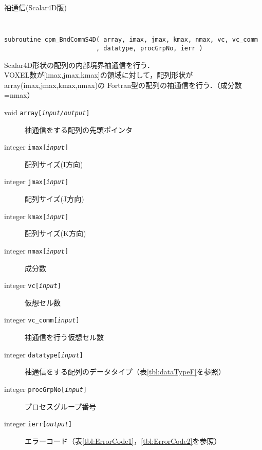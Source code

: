 \begin{spacing}{0.8}
\begin{itembox}[l]{袖通信(Scalar4D版)}
{\tt
\begin{verbatim}
subroutine cpm_BndCommS4D( array, imax, jmax, kmax, nmax, vc, vc_comm
                         , datatype, procGrpNo, ierr )
\end{verbatim}
}
Scalar4D形状の配列の内部境界袖通信を行う．\\
VOXEL数が[imax,jmax,kmax]の領域に対して，配列形状がarray(imax,jmax,kmax,nmax)の
Fortran型の配列の袖通信を行う．（成分数=nmax）
\begin{description}
\item[void    {\tt array[{\it input/output}]}] 袖通信をする配列の先頭ポインタ
\item[integer {\tt imax[{\it input}]}] 配列サイズ(I方向)
\item[integer {\tt jmax[{\it input}]}] 配列サイズ(J方向)
\item[integer {\tt kmax[{\it input}]}] 配列サイズ(K方向)
\item[integer {\tt nmax[{\it input}]}] 成分数
\item[integer {\tt vc[{\it input}]}] 仮想セル数
\item[integer {\tt vc\_comm[{\it input}]}] 袖通信を行う仮想セル数
\item[integer {\tt datatype[{\it input}]}] 袖通信をする配列のデータタイプ（表\ref{tbl:dataTypeF}を参照）
\item[integer {\tt procGrpNo[{\it input}]}] プロセスグループ番号
\item[integer {\tt ierr[{\it output}]}] エラーコード（表\ref{tbl:ErrorCode1}，\ref{tbl:ErrorCode2}を参照）
\end{description}
\end{itembox}\\
\end{spacing}

